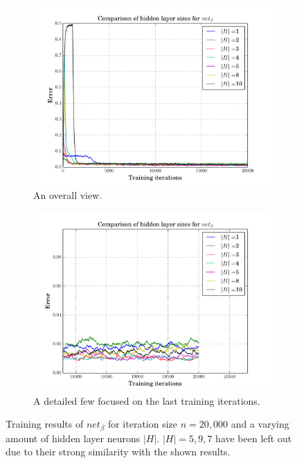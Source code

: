 \documentclass[10pt,a4paper,DIV=11]{scrreprt}
\begin{document}
\begin{figure}[H]
\centering
\begin{subfigure}{\textwidth}
  \centering
  \includegraphics[width=0.8\linewidth]{files/supervised/ha.pdf}
  \caption{An overall view.}
  \label{fig:hao}
\end{subfigure}%
\newline
\begin{subfigure}{\textwidth}
  \centering
  \includegraphics[width=0.8\linewidth]{files/supervised/haend.pdf}
  \caption{A detailed few focused on the last training iterations.}
  \label{fig:haend}
\end{subfigure}
\newline
\caption{Training results of $net_\beta$ for iteration size $n = 20,000$ and a 
         varying amount of hidden layer neurons $|H|$. $|H| = 5,9,7$ have 
         been left out due to their strong similarity with the shown results.}
\label{fig:ha}
\end{figure}
\end{document}
